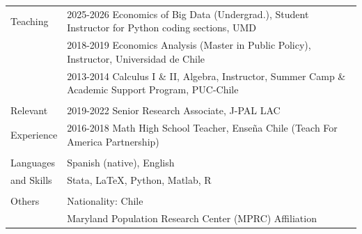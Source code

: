 \documentclass[letterpaper,11pt,oneside]{article}
\begin{document}
\begin{tabular}{@{} l l l}
\Large{Teaching}   & \multicolumn{2}{l}{2025-2026 \hspace{0.1in} Economics of Big Data (Undergrad.), Student Instructor for Python coding sections, UMD}  \\
 & \multicolumn{2}{l}{2018-2019 \hspace{0.1in} Economics Analysis (Master in Public Policy), Instructor, Universidad de Chile}  \\
 & \multicolumn{2}{l}{2013-2014 \hspace{0.1in} Calculus I \& II, Algebra, Instructor, Summer Camp \& Academic Support Program, PUC-Chile}  \\ \\

\Large{Relevant}   & \multicolumn{2}{l}{2019-2022 \hspace{0.1in} Senior Research Associate, J-PAL LAC }  \\
\Large{Experience} & \multicolumn{2}{l}{2016-2018 \hspace{0.1in} Math High School Teacher, Enseña Chile (Teach For America Partnership)} \\ \\

  
\Large{Languages}  & Spanish (native), English & \\
\Large{and Skills} & Stata, \LaTeX, Python, Matlab, R  &  \\ 

\\\Large{Others}   & Nationality: Chile & \\ 
                   & \multicolumn{2}{l}{Maryland Population Research Center (MPRC) Affiliation} \\ 

 
\end{tabular}
\end{document}
